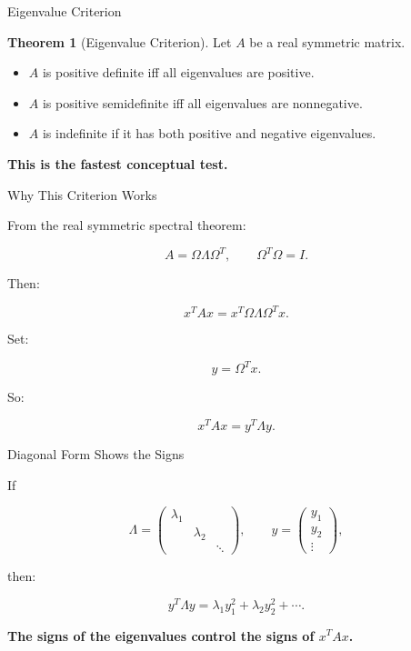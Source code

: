 \documentclass[10pt]{beamer}
\theoremstyle{definition}
\newtheorem{thm}{Theorem}[section]
\newcommand{\x}[1]{\alert{\textbf{#1}}}
\begin{document}
\begin{frame}{Eigenvalue Criterion}

\begin{thm}[Eigenvalue Criterion]
Let $A$ be a real symmetric matrix.

\begin{itemize}
\item $A$ is positive definite iff all eigenvalues are positive.
\item $A$ is positive semidefinite iff all eigenvalues are nonnegative.
\item $A$ is indefinite if it has both positive and negative eigenvalues.
\end{itemize}
\end{thm}

\vfill

\begin{center}
\x{This is the fastest conceptual test.}
\end{center}

\end{frame}


\begin{frame}{Why This Criterion Works}

From the real symmetric spectral theorem:

$$
A=\Omega\Lambda\Omega^T,
\qquad
\Omega^T\Omega=I.
$$

\vfill

Then:

$$
x^TAx
=x^T\Omega\Lambda\Omega^Tx.
$$

\vfill

Set:

$$
y=\Omega^Tx.
$$

\vfill

So:

$$
x^TAx=y^T\Lambda y.
$$

\end{frame}


\begin{frame}{Diagonal Form Shows the Signs}

If

$$
\Lambda=
\begin{pmatrix}
\lambda_1&&\\
&\lambda_2&\\
&&\ddots
\end{pmatrix},
\qquad
y=
\begin{pmatrix}
y_1\\y_2\\\vdots
\end{pmatrix},
$$

then:

$$
y^T\Lambda y
=\lambda_1y_1^2+\lambda_2y_2^2+\cdots.
$$

\vfill

\begin{center}
\x{The signs of the eigenvalues control the signs of $x^TAx$.}
\end{center}

\end{frame}
\end{document}
